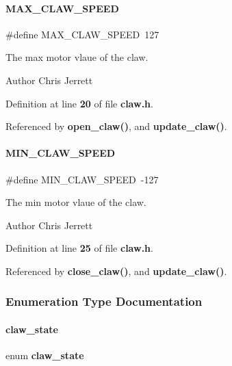 \paragraph{M\+A\+X\+\_\+\+C\+L\+A\+W\+\_\+\+S\+P\+E\+ED}
{\footnotesize\ttfamily \#define M\+A\+X\+\_\+\+C\+L\+A\+W\+\_\+\+S\+P\+E\+ED~127}



The max motor vlaue of the claw. 

\begin{DoxyAuthor}{Author}
Chris Jerrett 
\end{DoxyAuthor}


Definition at line \textbf{ 20} of file \textbf{ claw.\+h}.



Referenced by \textbf{ open\+\_\+claw()}, and \textbf{ update\+\_\+claw()}.

\mbox{\label{a00008_a7306e61a4209c74862aa81d7b3de74e5}} 
\paragraph{M\+I\+N\+\_\+\+C\+L\+A\+W\+\_\+\+S\+P\+E\+ED}
{\footnotesize\ttfamily \#define M\+I\+N\+\_\+\+C\+L\+A\+W\+\_\+\+S\+P\+E\+ED~-\/127}



The min motor vlaue of the claw. 

\begin{DoxyAuthor}{Author}
Chris Jerrett 
\end{DoxyAuthor}


Definition at line \textbf{ 25} of file \textbf{ claw.\+h}.



Referenced by \textbf{ close\+\_\+claw()}, and \textbf{ update\+\_\+claw()}.



\subsubsection{Enumeration Type Documentation}
\mbox{\label{a00008_a600668fd307d596c3812126657335324}} 
\paragraph{claw\+\_\+state}
{\footnotesize\ttfamily enum \textbf{ claw\+\_\+state}}




